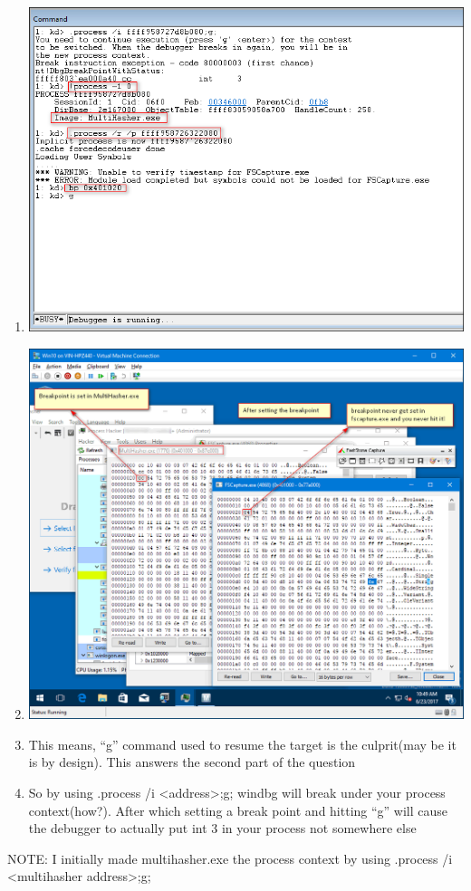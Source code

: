 \documentclass{article}
\begin{document}
\begin{enumerate}[noitemsep]
    \item
    \begin{minipage}{\linewidth}
    \includegraphics[width=\linewidth]{UsermodeBreakPointFromKD2.png}
    \end{minipage}

    \item
    \begin{minipage}{\linewidth}
    \includegraphics[width=\linewidth]{UsermodeBreakPointFromKD3.png}
    \end{minipage}

    \item This means, “g” command used to resume the target is the culprit(may be it is by design). This answers the second part of the question
    \item So by using .process /i <address>;g; windbg will break under your process context(how?). After which setting a break point and hitting “g” will cause the debugger to actually put int 3 in your process not somewhere else
\end{enumerate}
NOTE: I initially made multihasher.exe the process context by using .process /i <multihasher address>;g;
\end{document}

